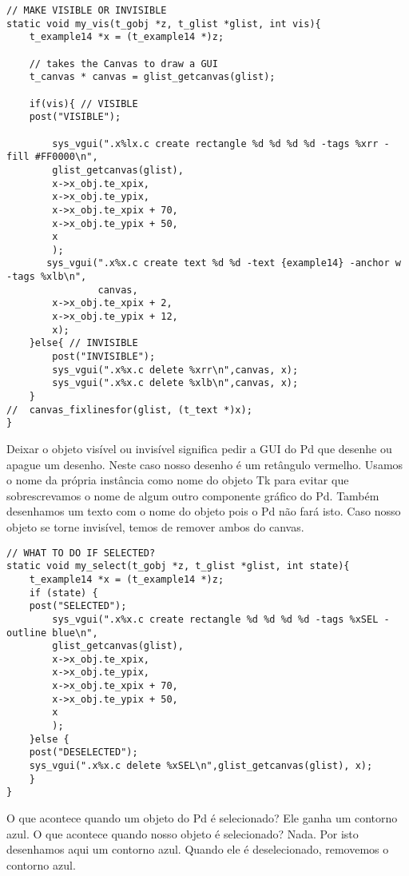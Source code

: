 \begin{lstlisting}
// MAKE VISIBLE OR INVISIBLE
static void my_vis(t_gobj *z, t_glist *glist, int vis){
	t_example14 *x = (t_example14 *)z;

	// takes the Canvas to draw a GUI
	t_canvas * canvas = glist_getcanvas(glist);

	if(vis){ // VISIBLE
	post("VISIBLE");

        sys_vgui(".x%lx.c create rectangle %d %d %d %d -tags %xrr -fill #FF0000\n",
		glist_getcanvas(glist),
		x->x_obj.te_xpix,
		x->x_obj.te_ypix,
		x->x_obj.te_xpix + 70,
		x->x_obj.te_ypix + 50,
		x
		);
       sys_vgui(".x%x.c create text %d %d -text {example14} -anchor w  -tags %xlb\n",
                canvas,
		x->x_obj.te_xpix + 2,
		x->x_obj.te_ypix + 12,
		x);
	}else{ // INVISIBLE
		post("INVISIBLE");
		sys_vgui(".x%x.c delete %xrr\n",canvas, x);
		sys_vgui(".x%x.c delete %xlb\n",canvas, x);
	}
//	canvas_fixlinesfor(glist, (t_text *)x);
}\end{lstlisting}

Deixar o objeto visível ou invisível significa pedir a GUI do Pd que desenhe ou apague um desenho.
Neste caso nosso desenho é um retângulo vermelho. Usamos o nome da própria instância como nome do
objeto Tk para evitar que sobrescrevamos o nome de algum outro componente gráfico do Pd. Também desenhamos
um texto com o nome do objeto pois o Pd não fará isto. Caso nosso objeto se torne invisível, temos de
remover ambos do canvas.

\begin{lstlisting}
// WHAT TO DO IF SELECTED?
static void my_select(t_gobj *z, t_glist *glist, int state){
 	t_example14 *x = (t_example14 *)z;
 	if (state) {
	post("SELECTED");
        sys_vgui(".x%x.c create rectangle %d %d %d %d -tags %xSEL -outline blue\n",
		glist_getcanvas(glist),
		x->x_obj.te_xpix,
		x->x_obj.te_ypix,
		x->x_obj.te_xpix + 70,
		x->x_obj.te_ypix + 50,
		x
		);
	}else {
	post("DESELECTED");
 	sys_vgui(".x%x.c delete %xSEL\n",glist_getcanvas(glist), x);
	}
}
\end{lstlisting}

O que acontece quando um objeto do Pd é selecionado? Ele ganha um contorno azul. O que acontece
quando nosso objeto é selecionado? Nada. Por isto desenhamos aqui um contorno azul. Quando ele
é deselecionado, removemos o contorno azul.

